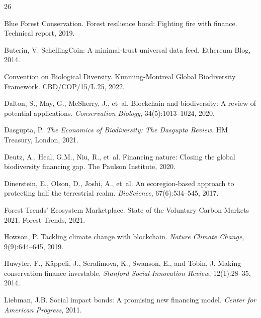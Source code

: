 \documentclass[11pt,a4paper]{article}
\begin{document}
\begin{thebibliography}{26}

Blue Forest Conservation.
\newblock Forest resilience bond: Fighting fire with finance.
\newblock Technical report, 2019.

Buterin, V.
\newblock SchellingCoin: A minimal-trust universal data feed.
\newblock Ethereum Blog, 2014.

Convention on Biological Diversity.
\newblock Kunming-Montreal Global Biodiversity Framework.
\newblock CBD/COP/15/L.25, 2022.

Dalton, S., May, G., McSherry, J., et~al.
\newblock Blockchain and biodiversity: A review of potential applications.
\newblock \emph{Conservation Biology}, 34(5):1013--1024, 2020.

Dasgupta, P.
\newblock \emph{The Economics of Biodiversity: The Dasgupta Review}.
\newblock HM Treasury, London, 2021.

Deutz, A., Heal, G.M., Niu, R., et~al.
\newblock Financing nature: Closing the global biodiversity financing gap.
\newblock The Paulson Institute, 2020.

Dinerstein, E., Olson, D., Joshi, A., et~al.
\newblock An ecoregion-based approach to protecting half the terrestrial realm.
\newblock \emph{BioScience}, 67(6):534--545, 2017.

Forest Trends' Ecosystem Marketplace.
\newblock State of the Voluntary Carbon Markets 2021.
\newblock Forest Trends, 2021.

Howson, P.
\newblock Tackling climate change with blockchain.
\newblock \emph{Nature Climate Change}, 9(9):644--645, 2019.

Huwyler, F., K{\"a}ppeli, J., Serafimova, K., Swanson, E., and Tobin, J.
\newblock Making conservation finance investable.
\newblock \emph{Stanford Social Innovation Review}, 12(1):28--35, 2014.

Liebman, J.B.
\newblock Social impact bonds: A promising new financing model.
\newblock \emph{Center for American Progress}, 2011.


\end{thebibliography}
\end{document}
